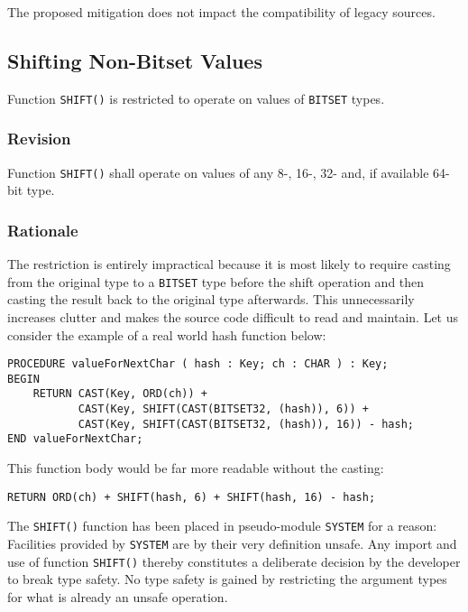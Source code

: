 \documentclass[10pt,a4paper,leqno,fleqn]{article}
\begin{document}
The proposed mitigation does not impact the compatibility of legacy sources.


\subsection{Shifting Non-Bitset Values}

Function \verb|SHIFT()| is restricted to operate on values of \verb|BITSET| types.

\subsubsection{Revision}

Function \verb|SHIFT()| shall operate on values of any 8-, 16-, 32-
and, if available 64-bit type.

\subsubsection{Rationale}

The restriction is entirely impractical because it is most likely to require casting
from the original type to a \verb|BITSET| type before the shift operation and
then casting the result back to the original type afterwards. This unnecessarily
increases clutter and makes the source code difficult to read and maintain.
Let us consider the example of a real world hash function below:

\lstset{style=modula2}
\begin{lstlisting}
PROCEDURE valueForNextChar ( hash : Key; ch : CHAR ) : Key;
BEGIN
    RETURN CAST(Key, ORD(ch)) +
           CAST(Key, SHIFT(CAST(BITSET32, (hash)), 6)) +
           CAST(Key, SHIFT(CAST(BITSET32, (hash)), 16)) - hash;
END valueForNextChar;
\end{lstlisting}

\noindent This function body would be far more readable without the casting:

\lstset{style=modula2}
\begin{lstlisting}
RETURN ORD(ch) + SHIFT(hash, 6) + SHIFT(hash, 16) - hash;
\end{lstlisting}

\noindent The \verb|SHIFT()| function has been placed in pseudo-module \verb|SYSTEM|
for a reason: Facilities provided by \verb|SYSTEM| are by their very definition
unsafe. Any import and use of function \verb|SHIFT()| thereby constitutes a
deliberate decision by the developer to break type safety. No type safety is
gained by restricting the argument types for what is already an unsafe
operation.
\end{document}
